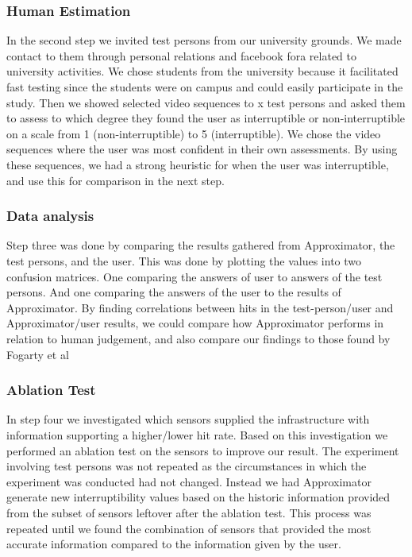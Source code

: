 \documentclass{sigchi}
\begin{document}
\subsubsection{Human Estimation}
In the second step we invited test persons from our university grounds. We made contact to them through personal relations and facebook fora related to university activities.
We chose students from the university because it facilitated fast testing since the students were on campus and could easily participate in the study.
Then we showed selected video sequences to x test persons and asked them to assess to which degree they found the user as interruptible or non-interruptible on a scale from 1 (non-interruptible) to 5 (interruptible).
We chose the video sequences where the user was most confident in their own assessments.
By using these sequences, we had a strong heuristic for when the user was interruptible, and use this for comparison in the next step.

\subsubsection{Data analysis}
Step three was done by comparing the results gathered from Approximator, the test persons, and the user.
This was done by plotting the values into two confusion matrices.
One comparing the answers of user to answers of the test persons.
And one comparing the answers of the user to the results of Approximator.
By finding correlations between hits in the test-person/user and Approximator/user results, we could compare how Approximator performs in relation to human judgement, and also compare our findings to those found by Fogarty et al \cite{fogarty2005predicting}

\subsubsection{Ablation Test}
In step four we investigated which sensors supplied the infrastructure with information supporting a higher/lower hit rate.
Based on this investigation we performed an ablation test on the sensors to improve our result.
The experiment involving test persons was not repeated as the circumstances in which the experiment was conducted had not changed.
Instead we had Approximator generate new interruptibility values based on the historic information provided from the subset of sensors leftover after the ablation test.
This process was repeated until we found the combination of sensors that provided the most accurate information compared to the information given by the user.
\end{document}
